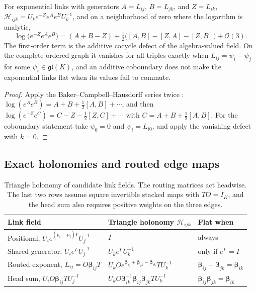\documentclass[twoside,11pt]{article}
\begin{document}
\begin{lemma}
\label{lem:lie_bch}
For exponential links with generators $A=L_{ij}$, $B=L_{jk}$, and $Z=L_{ik}$, $\mathcal H_{ijk}=U_ke^{-Z}e^{A}e^{B}U_k^{-1}$, and on a neighborhood of zero where the logarithm is analytic,
\begin{equation}
\log\bigl(e^{-Z}e^{A}e^{B}\bigr)=(A+B-Z)+\tfrac12\bigl([A,B]-[Z,A]-[Z,B]\bigr)+\mathcal O(3).
\label{eq:lie_bch}
\end{equation}
The first-order term is the additive cocycle defect of the algebra-valued field. On the complete ordered graph it vanishes for all triples exactly when $L_{ij}=\psi_i-\psi_j$ for some $\psi_i\in\mathfrak{gl}(K)$, and an additive coboundary does not make the exponential links flat when its values fail to commute.
\end{lemma}
\begin{proof}
Apply the Baker--Campbell--Hausdorff series twice \citep{Hall2015}: $\log(e^Ae^B)=A+B+\tfrac12[A,B]+\cdots$, and then $\log(e^{-Z}e^C)=C-Z-\tfrac12[Z,C]+\cdots$ with $C=A+B+\tfrac12[A,B]$. For the coboundary statement take $\psi_0=0$ and $\psi_i=L_{i0}$, and apply the vanishing defect with $k=0$.
\end{proof}

\subsection{Exact holonomies and routed edge maps}
\label{supp:holonomy_exact}

\begin{table}[ht]
\centering
\small
\begin{tabularx}{\textwidth}{@{}>{\raggedright\arraybackslash}p{}X>{\raggedright\arraybackslash}p{}@{}}
\toprule
Link field & Triangle holonomy $\mathcal H_{ijk}$ & Flat when \\
\midrule
Positional, $U_ie^{(p_i-p_j)Y}U_j^{-1}$ & $I$ & always \\
Shared generator, $U_ie^{L}U_j^{-1}$ & $U_ke^{L}U_k^{-1}$ & only if $e^{L}=I$ \\
Routed exponent, $L_{ij}=O\boldsymbol\beta_{ij}T$ & $U_kOe^{\boldsymbol\beta_{ij}+\boldsymbol\beta_{jk}-\boldsymbol\beta_{ik}}TU_k^{-1}$ & $\boldsymbol\beta_{ij}+\boldsymbol\beta_{jk}=\boldsymbol\beta_{ik}$ \\
Head sum, $U_iO\boldsymbol\beta_{ij}TU_j^{-1}$ & $U_kO\boldsymbol\beta_{ik}^{-1}\boldsymbol\beta_{ij}\boldsymbol\beta_{jk}TU_k^{-1}$ & $\boldsymbol\beta_{ij}\boldsymbol\beta_{jk}=\boldsymbol\beta_{ik}$ \\
\bottomrule
\end{tabularx}
\caption{Triangle holonomy of candidate link fields. The routing matrices act headwise. The last two rows assume square invertible stacked maps with $TO=I_K$, and the head sum also requires positive weights on the three edges.}
\label{tab:lie_holonomy}
\end{table}
\end{document}
